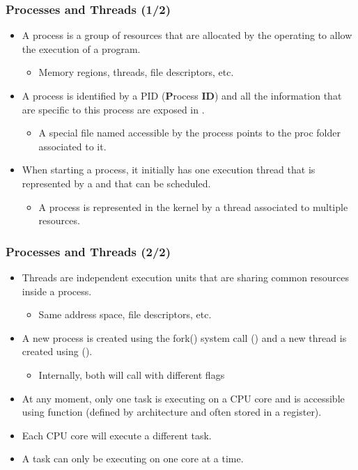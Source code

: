 \begin{frame}
  \frametitle{Processes and Threads (1/2)}
  \begin{itemize}
    \item A process is a group of resources that are allocated by the operating
          to allow the execution of a program.
    \begin{itemize}
      \item Memory regions, threads, file descriptors, etc.
    \end{itemize}
    \item A process is identified by a PID ({\bf P}rocess {\bf ID}) and all the
          information that are specific to this process are exposed in
          .
    \begin{itemize}
      \item A special file named  accessible by the process
            points to the proc folder associated to it.
    \end{itemize}
    \item When starting a process, it initially has one execution thread that
          is represented by a  and that can be scheduled.
    \begin{itemize}
      \item A process is represented in the kernel by a thread associated to
            multiple resources.
    \end{itemize}
  \end{itemize}
\end{frame}

\begin{frame}
  \frametitle{Processes and Threads (2/2)}
  \begin{itemize}
    \item Threads are independent execution units that are sharing common
          resources inside a process.
    \begin{itemize}
      \item Same address space, file descriptors, etc.
    \end{itemize}
    \item A new process is created using the fork() system call
          () and a new thread is created using
           ().
    \begin{itemize}
      \item Internally, both will call  with different flags
    \end{itemize}
    \item At any moment, only one task is executing on a CPU core and is
          accessible using  function (defined by
          architecture and often stored in a register).
    \item Each CPU core will execute a different task.
    \item A task can only be executing on one core at a time.
  \end{itemize}
\end{frame}

